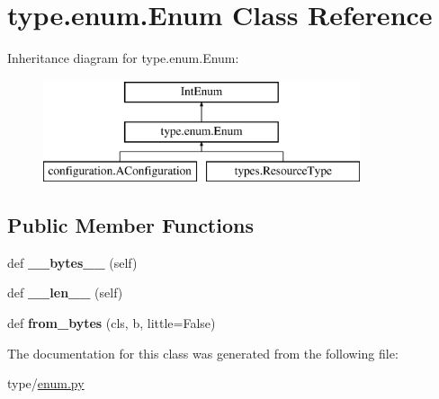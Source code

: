 \hypertarget{classtype_1_1enum_1_1Enum}{}\section{type.\+enum.\+Enum Class Reference}
\label{classtype_1_1enum_1_1Enum}
Inheritance diagram for type.\+enum.\+Enum\+:\begin{figure}[H]
\begin{center}
\leavevmode
\includegraphics[height=3.000000cm]{classtype_1_1enum_1_1Enum}
\end{center}
\end{figure}
\subsection*{Public Member Functions}
\begin{DoxyCompactItemize}
\item 
\mbox{\label{classtype_1_1enum_1_1Enum_aa03d56ac35a3c6d728f951e4b79b29e8}} 
def {\bfseries \+\_\+\+\_\+bytes\+\_\+\+\_\+} (self)
\item 
\mbox{\label{classtype_1_1enum_1_1Enum_a4a52371bcdd0c1b8112b1d4023235a7d}} 
def {\bfseries \+\_\+\+\_\+len\+\_\+\+\_\+} (self)
\item 
\mbox{\label{classtype_1_1enum_1_1Enum_a51220f898d5d0b5f22bce6354ccb438c}} 
def {\bfseries from\+\_\+bytes} (cls, b, little=False)
\end{DoxyCompactItemize}


The documentation for this class was generated from the following file\+:\begin{DoxyCompactItemize}
\item 
type/\mbox{\hyperlink{enum_8py}{enum.\+py}}\end{DoxyCompactItemize}
